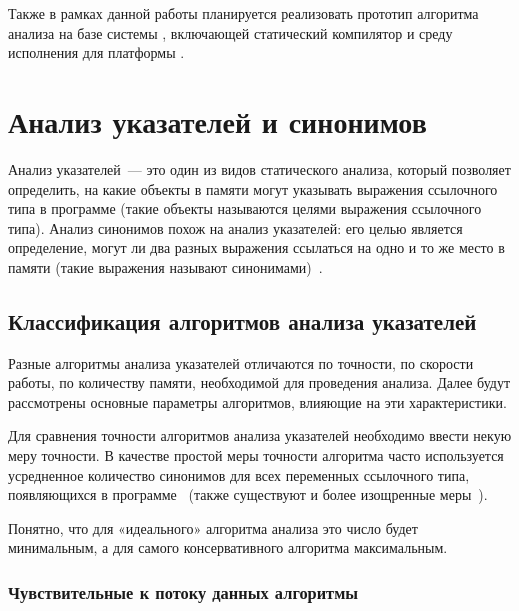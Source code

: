 \documentclass[14pt,titlepage,draft]{extarticle}
\begin{document}
    Также в рамках данной работы планируется реализовать прототип алгоритма
    анализа на базе системы ,
    включающей статический компилятор и среду исполнения для платформы
    .

  \section{Анализ указателей и синонимов}

    Анализ указателей~--- это один из видов статического анализа, который
    позволяет определить, на какие объекты в памяти могут указывать выражения
    ссылочного типа в программе (такие объекты называются целями выражения
    ссылочного типа). Анализ синонимов похож на анализ указателей: его целью
    является определение, могут ли два разных выражения ссылаться на одно и
    то же место в памяти (такие выражения называют синонимами)~\cite{andersen}.

    \subsection{Классификация алгоритмов анализа указателей}
    \label{section:analysis_classification}

      Разные алгоритмы анализа указателей отличаются по точности, по скорости
      работы, по количеству памяти, необходимой для проведения анализа.
      Далее будут рассмотрены основные параметры алгоритмов, влияющие на эти
      характеристики.

      Для сравнения точности алгоритмов анализа указателей необходимо ввести
      некую меру точности. В качестве простой меры точности алгоритма часто
      используется усредненное количество синонимов для всех переменных
      ссылочного типа, появляющихся в
      программе~\cite[раздел~3.2]{hind_pointer_analysis_not_solved_yet}
      (также существуют и более изощренные
      меры~\cite{hind_pointer_analysis_not_solved_yet,diwan_tbaa}).

      Понятно, что для «идеального» алгоритма анализа это число будет
      минимальным, а для самого консервативного алгоритма максимальным.

      \subsubsection{Чувствительные к потоку данных алгоритмы}
        \label{section:analysis_classification_data_flow}
\end{document}
